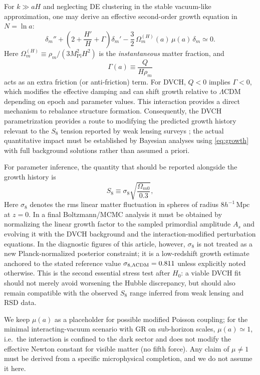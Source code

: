 \documentclass[pdflatex,sn-mathphys-num]{sn-jnl}%
\newcommand{\mpl}{M_{\mathrm{Pl}}}
\begin{document}
For $k\gg aH$ and neglecting DE clustering in the stable vacuum-like
approximation, one may derive an effective second-order growth equation in
$N=\ln a$:
\begin{equation}
\delta_m'' + \left(2+\frac{H'}{H}+\Gamma\right)\delta_m'
- \frac{3}{2}\,\Omega_m^{(H)}(a)\,\mu(a)\,\delta_m \simeq 0.
\label{eq:growth}
\end{equation}
Here $\Omega_m^{(H)}\equiv \rho_m/(3\mpl^2 H^2)$ is the \emph{instantaneous}
matter fraction, and
\begin{equation}
\Gamma(a)\equiv \frac{Q}{H\rho_m}
\end{equation}
acts as an extra friction (or anti-friction) term. For DVCH, $Q<0$ implies
$\Gamma<0$, which modifies the effective damping and can shift growth relative
to $\Lambda$CDM depending on epoch and parameter values. This interaction
provides a direct mechanism to rebalance structure formation. Consequently,
the DVCH parametrization provides a route to modifying the predicted
growth history relevant to the $S_8$ tension reported by weak lensing surveys
\cite{Asgari:2020wuj,Abbott:2021asy}; the actual quantitative impact must be
established by Bayesian analyses using \eqref{eq:growth} with full background
solutions rather than assumed a priori.

For parameter inference, the quantity that should be reported alongside the
growth history is
\begin{equation}
S_8 \equiv \sigma_8\sqrt{\frac{\Omega_{m0}}{0.3}},
\label{eq:S8_def}
\end{equation}
Here $\sigma_8$ denotes the rms linear matter fluctuation in spheres of radius
$8h^{-1}\,\mathrm{Mpc}$ at $z=0$. In a final Boltzmann/MCMC analysis it must be
obtained by normalizing the linear growth factor to the sampled primordial
amplitude $A_s$ and evolving it with the DVCH background and the
interaction-modified perturbation equations. In the diagnostic figures of this
article, however, $\sigma_8$ is not treated as a new Planck-normalized posterior
constraint; it is a low-redshift growth estimate anchored to the stated
reference value $\sigma_{8,\Lambda{\rm CDM}}=0.811$ unless explicitly noted
otherwise. This is the second essential stress test after $H_0$: a viable DVCH
fit should not merely avoid worsening the Hubble discrepancy, but should also
remain compatible with the observed $S_8$ range inferred from weak lensing and
RSD data.

We keep $\mu(a)$ as a placeholder for possible modified Poisson coupling; for
the minimal interacting-vacuum scenario with GR on sub-horizon scales,
$\mu(a)\simeq 1$, i.e.\ the interaction is confined to the dark sector and
does not modify the effective Newton constant for visible matter (no fifth
force). Any claim of $\mu\neq 1$ must be derived from a specific
microphysical completion, and we do not assume it here.
\end{document}
